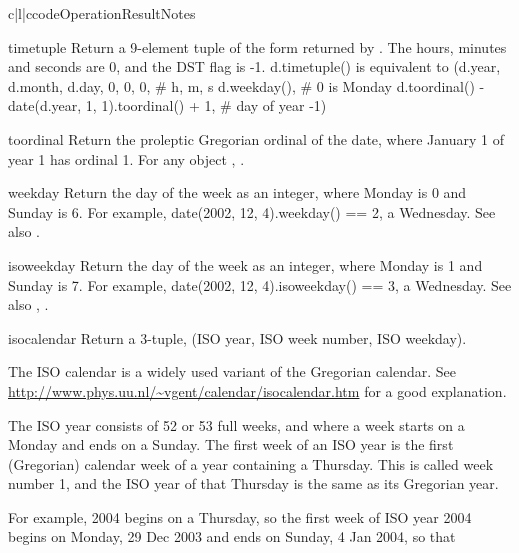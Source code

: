 \begin{tableiii}{c|l|c}{code}{Operation}{Result}{Notes}
\begin{methoddesc}{timetuple}{}
    Return a 9-element tuple of the form returned by
    .  The hours, minutes and seconds are
    0, and the DST flag is -1.
    d.timetuple() is equivalent to
        (d.year, d.month, d.day,
         0, 0, 0,  \# h, m, s
         d.weekday(),  \# 0 is Monday
         d.toordinal() - date(d.year, 1, 1).toordinal() + 1, \# day of year
         -1)
\end{methoddesc}
\begin{methoddesc}{toordinal}{}
    Return the proleptic Gregorian ordinal of the date, where January 1
    of year 1 has ordinal 1.  For any  object ,
    .
\end{methoddesc}
\begin{methoddesc}{weekday}{}
    Return the day of the week as an integer, where Monday is 0 and
    Sunday is 6.  For example, date(2002, 12, 4).weekday() == 2, a
    Wednesday.
    See also .
\end{methoddesc}
\begin{methoddesc}{isoweekday}{}
    Return the day of the week as an integer, where Monday is 1 and
    Sunday is 7.  For example, date(2002, 12, 4).isoweekday() == 3, a
    Wednesday.
    See also , .
\end{methoddesc}
\begin{methoddesc}{isocalendar}{}
    Return a 3-tuple, (ISO year, ISO week number, ISO weekday).

    The ISO calendar is a widely used variant of the Gregorian calendar.
    See \url{http://www.phys.uu.nl/~vgent/calendar/isocalendar.htm}
    for a good explanation.

    The ISO year consists of 52 or 53 full weeks, and where a week starts
    on a Monday and ends on a Sunday.  The first week of an ISO year is
    the first (Gregorian) calendar week of a year containing a Thursday.
    This is called week number 1, and the ISO year of that Thursday is
    the same as its Gregorian year.

    For example, 2004 begins on a Thursday, so the first week of ISO
    year 2004 begins on Monday, 29 Dec 2003 and ends on Sunday, 4 Jan
    2004, so that


\end{methoddesc}
\end{tableiii}
